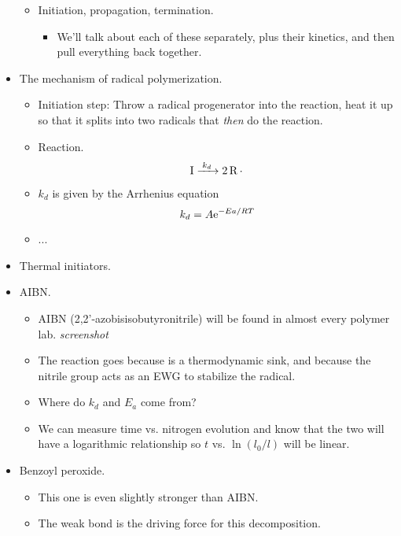 \documentclass[../notes.tex]{subfiles}
\begin{document}
\begin{itemize}
\begin{itemize}
\begin{itemize}
        \end{itemize}
        \item Initiation, propagation, termination.
        \begin{itemize}
            \item We'll talk about each of these separately, plus their kinetics, and then pull everything back together.
        \end{itemize}
    \end{itemize}
    \item The mechanism of radical polymerization.
    \begin{itemize}
        \item Initiation step: Throw a radical progenerator into the reaction, heat it up so that it splits into two radicals that \emph{then} do the reaction.
        \item Reaction.
        \begin{equation*}
            \ce{I ->[$k_d$] 2R*}
        \end{equation*}
        \item $k_d$ is given by the Arrhenius equation
        \begin{equation*}
            k_d = A\e[-Ea/RT]
        \end{equation*}
        \item ...
    \end{itemize}
    \item Thermal initiators.
    \item AIBN.
    \begin{itemize}
        \item AIBN (2,2'-azobisisobutyronitrile) will be found in almost every polymer lab.
        \emph{screenshot}
        \item The reaction goes because  is a thermodynamic sink, and because the nitrile group acts as an EWG to stabilize the radical.
        \item Where do $k_d$ and $E_a$ come from?
        \item We can measure time vs. nitrogen evolution and know that the two will have a logarithmic relationship so $t$ vs. $\ln(l_0/l)$ will be linear.
    \end{itemize}
    \item Benzoyl peroxide.
    \begin{itemize}
        \item This one is even slightly stronger than AIBN.
        \item The weak  bond is the driving force for this decomposition.

\end{itemize}
\end{itemize}
\end{document}
